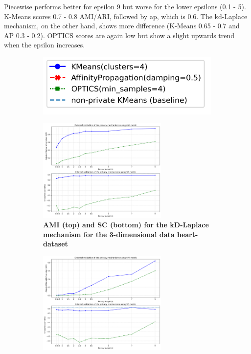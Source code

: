 Piecewise performs better for epsilon 9 but worse for the lower epsilons (0.1 - 5).
K-Means scores 0.7 - 0.8 AMI/ARI, followed by \gls{ap}, which is 0.6.
The kd-Laplace mechanism, on the other hand, shows more difference (K-Means 0.65 - 0.7 and AP 0.3 - 0.2).
OPTICS scores are again low but show a slight upwards trend when the epsilon increases.
\newpage
\begin{figure}[H]
    \centering
    \begin{subfigure}{0.3\textwidth}
        \includegraphics[width=\textwidth]{Results/2d-laplace/heart-dataset/legend.png}
    \end{subfigure}
    \begin{subfigure}{1\textwidth}
        \centering
        \includegraphics[width=0.70\textwidth]{Results/kd-laplace/kd-Laplace/heart-dataset/ami-and-sc_3_dimensions.png}
        \centering
        \caption{\textbf{AMI (top) and SC (bottom) for the kD-Laplace mechanism for the 3-dimensional data heart-dataset}}
    \end{subfigure}
    \begin{subfigure}{1\textwidth}
        \centering
        \includegraphics[width=0.70\textwidth]{Results/kd-laplace/piecewise/heart-dataset/ami-and-sc_3_dimensions.png}

\end{subfigure}
\end{figure}
